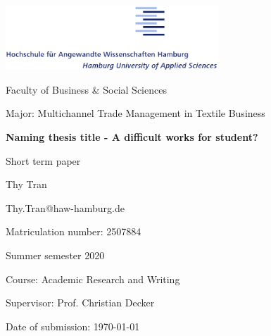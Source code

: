 \begin{titlepage}
	\begin{flushright}
		\includegraphics[width=0.6\textwidth]{HAW_logo.png}

		Faculty of Business \& Social Sciences 

		Major: Multichannel Trade Management in Textile Business
	\end{flushright}
	
	\vspace{3cm}

	\begin{center}
		\huge{\textbf{Naming thesis title - A difficult works for student?}}

		\large{Short term paper}
	\end{center}

	\vspace{6cm}

	\begin{flushleft}
		Thy Tran

		Thy.Tran@haw-hamburg.de

		Matriculation number:  2507884

		Summer semester 2020

		Course: Academic Research and Writing

		Supervisor: Prof. Christian Decker

		Date of submission: \today
	\end{flushleft}
\end{titlepage}
